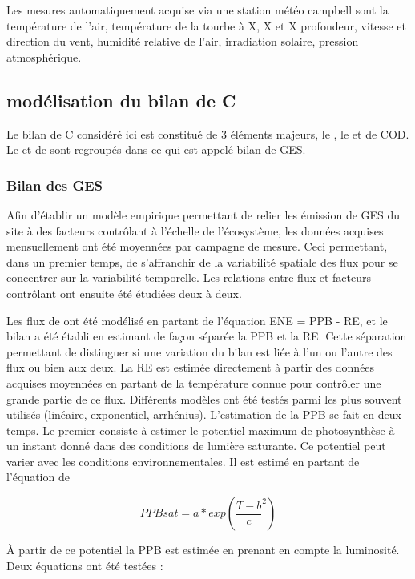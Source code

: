 Les mesures automatiquement acquise via une station météo campbell sont la température de l'air, température de la tourbe à X, X et X profondeur, vitesse et direction du vent, humidité relative de l'air, irradiation solaire, pression atmosphérique.

\subsection{modélisation du bilan de C}

Le bilan de C considéré ici est constitué de 3 éléments majeurs, le \coo, le \chh et de COD.
Le \coo et de \chh sont regroupés dans ce qui est appelé bilan de GES.

\subsubsection{Bilan des GES}

Afin d'établir un modèle empirique permettant de relier les émission de GES du site à des facteurs contrôlant à l'échelle de l'écosystème, les données acquises mensuellement ont été moyennées par campagne de mesure.
Ceci permettant, dans un premier temps, de s'affranchir de la variabilité spatiale des flux pour se concentrer sur la variabilité temporelle.
Les relations entre flux et facteurs contrôlant ont ensuite été étudiées deux à deux.

Les flux de \coo ont été modélisé en partant de l'équation ENE = PPB - RE, et le bilan a été établi en estimant de façon séparée la PPB et la RE.
Cette séparation permettant de distinguer si une variation du bilan est liée à l'un ou l'autre des flux ou bien aux deux.
La RE est estimée directement à partir des données acquises moyennées en partant de la température connue pour contrôler une grande partie de ce flux.
Différents modèles ont été testés parmi les plus souvent utilisés (linéaire, exponentiel, arrhénius).
L'estimation de la PPB se fait en deux temps.
Le premier consiste à estimer le potentiel maximum de photosynthèse à un instant donné dans des conditions de lumière saturante.
Ce potentiel peut varier avec les conditions environnementales.
Il est estimé en partant de l'équation de \cite{june2004}

\begin{equation}
PPBsat = a * exp(\frac{T - b}{c}^2)
\end{equation}

À partir de ce potentiel la PPB est estimée en prenant en compte la luminosité.
Deux équations ont été testées :

